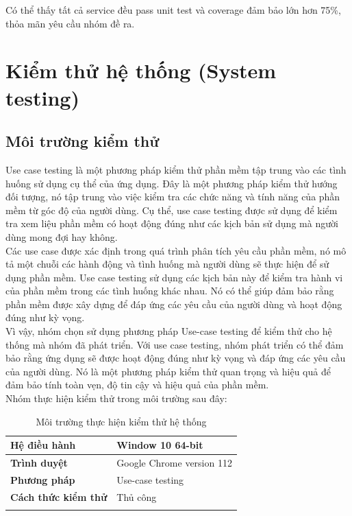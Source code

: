 Có thể thấy tất cả service đều pass unit test và coverage đảm bảo lớn hơn 75\%, thỏa mãn yêu cầu nhóm đề ra.

\section{Kiểm thử hệ thống (System testing)}
\subsection{Môi trường kiểm thử}

Use case testing là một phương pháp kiểm thử phần mềm tập trung vào các tình huống sử dụng cụ thể của ứng dụng. Đây là một phương pháp kiểm thử hướng đối tượng, nó tập trung vào việc kiểm tra các chức năng và tính năng của phần mềm từ góc độ của người dùng. Cụ thể, use case testing được sử dụng để kiểm tra xem liệu phần mềm có hoạt động đúng như các kịch bản sử dụng mà người dùng mong đợi hay không.\\

Các use case được xác định trong quá trình phân tích yêu cầu phần mềm, nó mô tả một chuỗi các hành động và tình huống mà người dùng sẽ thực hiện để sử dụng phần mềm. Use case testing sử dụng các kịch bản này để kiểm tra hành vi của phần mềm trong các tình huống khác nhau. Nó có thể giúp đảm bảo rằng phần mềm được xây dựng để đáp ứng các yêu cầu của người dùng và hoạt động đúng như kỳ vọng.\\

Vì vậy, nhóm chọn sử dụng phương pháp Use-case testing để kiểm thử cho hệ thống mà nhóm đã phát triển. Với use case testing, nhóm phát triển có thể đảm bảo rằng ứng dụng sẽ được hoạt động đúng như kỳ vọng và đáp ứng các yêu cầu của người dùng. Nó là một phương pháp kiểm thử quan trọng và hiệu quả để đảm bảo tính toàn vẹn, độ tin cậy và hiệu quả của phần mềm.\\

\hspace*{0.5cm}Nhóm thực hiện kiểm thử trong môi trường sau đây:
\\
{
\setlength\extrarowheight{6pt}
\begin{longtable}{| p{} | p{} |}
    \hline
    \textbf{Hệ điều hành}       & Window 10 64-bit          \\
    \hline
    \textbf{Trình duyệt}        & Google Chrome version 112 \\
    \hline
    \textbf{Phương pháp}        & Use-case testing          \\
    \hline
    \textbf{Cách thức kiểm thử} & Thủ công                  \\
    \hline
    \caption{Môi trường thực hiện kiểm thử hệ thống}
\end{longtable}
}

